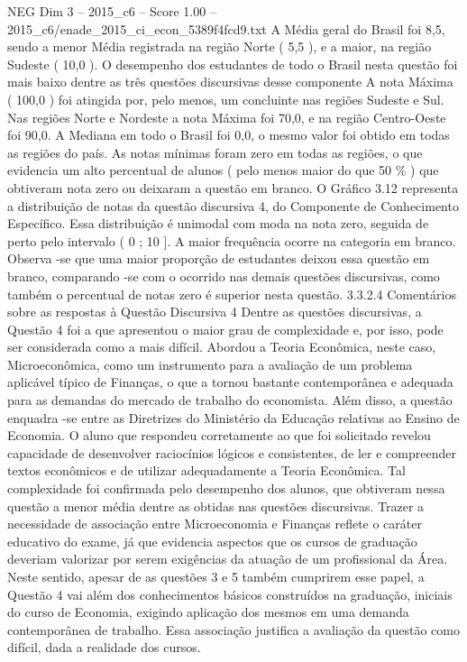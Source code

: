 \begin{textsample}{NEG Dim 3 – 2015\_c6 – Score 1.00 – 2015\_c6/enade\_2015\_ci\_econ\_5389f4fcd9.txt}
A Média geral do Brasil foi 8,5, sendo a menor Média registrada na região Norte ( 5,5 ), e a maior, na região Sudeste ( 10,0 ).
O desempenho dos estudantes de todo o Brasil nesta questão foi mais baixo dentre as três questões discursivas desse componente A nota Máxima ( 100,0 ) foi atingida por, pelo menos, um concluinte nas regiões Sudeste e Sul.
Nas regiões Norte e Nordeste a nota Máxima foi 70,0, e na região Centro-Oeste foi 90,0.
A Mediana em todo o Brasil foi 0,0, o mesmo valor foi obtido em todas as regiões do país.
As notas mínimas foram zero em todas as regiões, o que evidencia um alto percentual de alunos ( pelo menos maior do que 50 \% ) que obtiveram nota zero ou deixaram a questão em branco.
O Gráfico 3.12 representa a distribuição de notas da questão discursiva 4, do Componente de Conhecimento Específico.
Essa distribuição é unimodal com moda na nota zero, seguida de perto pelo intervalo ( 0 ; 10 ].
A maior frequência ocorre na categoria em branco.
Observa -se que uma maior proporção de estudantes deixou essa questão em branco, comparando -se com o ocorrido nas demais questões discursivas, como também o percentual de notas zero é superior nesta questão. 3.3.2.4 Comentários sobre as respostas à Questão Discursiva 4 Dentre as questões discursivas, a Questão 4 foi a que apresentou o maior grau de complexidade e, por isso, pode ser considerada como a mais difícil.
Abordou a Teoria Econômica, neste caso, Microeconômica, como um instrumento para a avaliação de um problema aplicável típico de Finanças, o que a tornou bastante contemporânea e adequada para as demandas do mercado de trabalho do economista.
Além disso, a questão enquadra -se entre as Diretrizes do Ministério da Educação relativas ao Ensino de Economia.
O aluno que respondeu corretamente ao que foi solicitado revelou capacidade de desenvolver raciocínios lógicos e consistentes, de ler e compreender textos econômicos e de utilizar adequadamente a Teoria Econômica.
Tal complexidade foi confirmada pelo desempenho dos alunos, que obtiveram nessa questão a menor média dentre as obtidas nas questões discursivas.
Trazer a necessidade de associação entre Microeconomia e Finanças reflete o caráter educativo do exame, já que evidencia aspectos que os cursos de graduação deveriam valorizar por serem exigências da atuação de um profissional da Área.
Neste sentido, apesar de as questões 3 e 5 também cumprirem esse papel, a Questão 4 vai além dos conhecimentos básicos construídos na graduação, iniciais do curso de Economia, exigindo aplicação dos mesmos em uma demanda contemporânea de trabalho.
Essa associação justifica a avaliação da questão como difícil, dada a realidade dos cursos.

\end{textsample}
